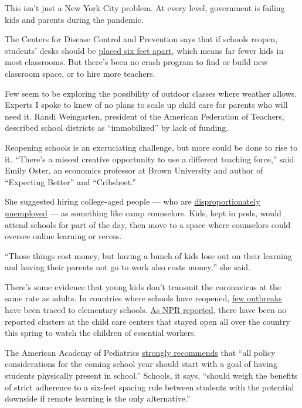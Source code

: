 This isn't just a New York City problem. At every level, government is
failing kids and parents during the pandemic.

The Centers for Disease Control and Prevention says that if schools
reopen, students' desks should be
\href{https://www.cdc.gov/coronavirus/2019-ncov/downloads/php/CDC-Activities-Initiatives-for-COVID-19-Response.pdf}{placed
six feet apart}, which means far fewer kids in most classrooms. But
there's been no crash program to find or build new classroom space, or
to hire more teachers.

Few seem to be exploring the possibility of outdoor classes where
weather allows. Experts I spoke to knew of no plans to scale up child
care for parents who will need it. Randi Weingarten, president of the
American Federation of Teachers, described school districts as
``immobilized'' by lack of funding.

Reopening schools is an excruciating challenge, but more could be done
to rise to it. ``There's a missed creative opportunity to use a
different teaching force,'' said Emily Oster, an economics professor at
Brown University and author of ``Expecting Better'' and ``Cribsheet.''

She suggested hiring college-aged people --- who are
\href{http://pewresearch.org/fact-tank/2020/06/11/unemployment-rose-higher-in-three-months-of-covid-19-than-it-did-in-two-years-of-the-great-recession/}{disproportionately
unemployed} --- as something like camp counselors. Kids, kept in pods,
would attend schools for part of the day, then move to a space where
counselors could oversee online learning or recess.

``Those things cost money, but having a bunch of kids lose out on their
learning and having their parents not go to work also costs money,'' she
said.

There's some evidence that young kids don't transmit the coronavirus at
the same rate as adults. In countries where schools have reopened,
\href{https://www.wired.com/story/its-ridiculous-to-treat-schools-like-covid-hot-zones/}{few
outbreaks} have been traced to elementary schools.
\href{https://www.npr.org/2020/06/24/882316641/what-parents-can-learn-from-child-care-centers-that-stayed-open-during-lockdowns}{As
NPR reported}, there have been no reported clusters at the child care
centers that stayed open all over the country this spring to watch the
children of essential workers.

The American Academy of Pediatrics
\href{https://services.aap.org/en/pages/2019-novel-coronavirus-covid-19-infections/clinical-guidance/covid-19-planning-considerations-return-to-in-person-education-in-schools/}{strongly
recommends} that ``all policy considerations for the coming school year
should start with a goal of having students physically present in
school.'' Schools, it says, ``should weigh the benefits of strict
adherence to a six-feet spacing rule between students with the potential
downside if remote learning is the only alternative.''

